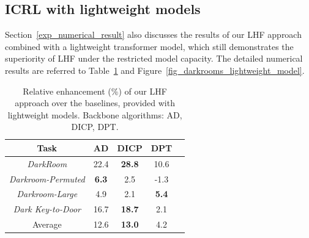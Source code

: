 \documentclass{article}
\begin{document}
\subsection{ICRL with lightweight models}
\label{append_addition_result_lightweight_model}

Section~\ref{exp_numerical_result} also discusses the results of our LHF approach combined with a lightweight transformer model, which still demonstrates the superiority of LHF under the restricted model capacity. The detailed numerical results are referred to Table~\ref{tab_darkrooms_lightweight_model} and
Figure~\ref{fig_darkrooms_lightweight_model}.








\begin{table}[ht]
    \caption{Relative enhancement (\%) of our LHF approach over the baselines, provided with lightweight models. Backbone algorithms: AD, DICP, DPT.}
    \label{tab_darkrooms_lightweight_model}
    \centering
    \begin{tabular}{ccccc}
    \toprule
    Task & AD & DICP & DPT \\
    \midrule
     \textit{DarkRoom} & 22.4 & \textbf{28.8} & 10.6 \\
     \textit{Darkroom-Permuted} & \textbf{6.3} & 2.5 & -1.3 \\
     \textit{Darkroom-Large} & 4.9 & 2.1 & \textbf{5.4} \\
     \textit{Dark Key-to-Door} & 16.7 & \textbf{18.7} & 2.1 \\
    \midrule
    Average & 12.6 & \textbf{13.0} & 4.2 \\
    \bottomrule
    \end{tabular}
\end{table}
\end{document}
